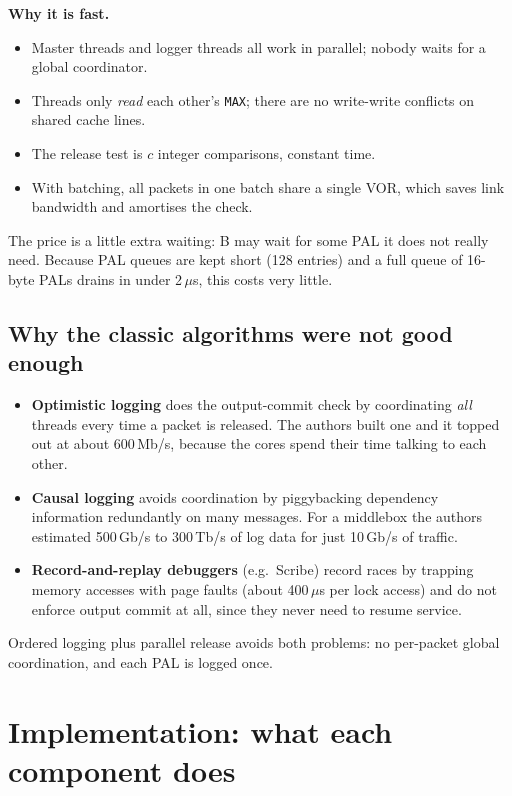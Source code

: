 \textbf{Why it is fast.}
\begin{itemize}
  \item Master threads and logger threads all work in parallel; nobody waits for a global coordinator.
  \item Threads only \emph{read} each other's \texttt{MAX}; there are no write-write conflicts on shared cache lines.
  \item The release test is $c$ integer comparisons, constant time.
  \item With batching, all packets in one batch share a single VOR, which saves link bandwidth and amortises the check.
\end{itemize}
The price is a little extra waiting: B may wait for some PAL it does not really need. Because PAL queues are kept short (128 entries)
and a full queue of 16-byte PALs drains in under 2\,$\mu$s, this costs very little.

\subsection{Why the classic algorithms were not good enough}\label{sec:ftmbclassic}
\begin{itemize}
  \item \textbf{Optimistic logging} does the output-commit check by coordinating \emph{all} threads every time a packet is released. The authors
        built one and it topped out at about 600\,Mb/s, because the cores spend their time talking to each other.
  \item \textbf{Causal logging} avoids coordination by piggybacking dependency information redundantly on many messages. For a middlebox the
        authors estimated 500\,Gb/s to 300\,Tb/s of log data for just 10\,Gb/s of traffic.
  \item \textbf{Record-and-replay debuggers} (e.g.\ Scribe) record races by trapping memory accesses with page faults (about 400\,$\mu$s per
        lock access) and do not enforce output commit at all, since they never need to resume service.
\end{itemize}
Ordered logging plus parallel release avoids both problems: no per-packet global coordination, and each PAL is logged once.

\section{Implementation: what each component does}


